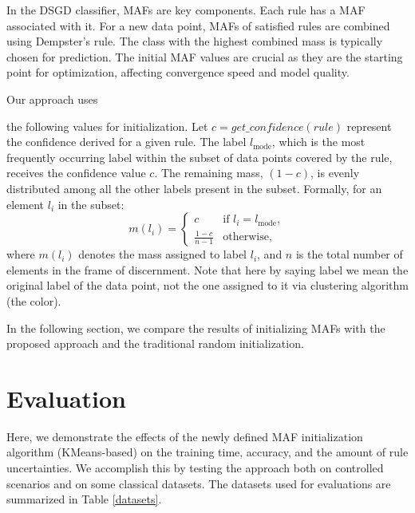 \documentclass[10pt,a4paper,oneside]{article}
\begin{document}
{\color{red}In the DSGD classifier, MAFs are key components. Each rule has a MAF associated with it. For a new data point, MAFs of satisfied rules are combined using Dempster's rule. The class with the highest combined mass is typically chosen for prediction. The initial MAF values are crucial as they are the starting point for optimization, affecting convergence speed and model quality.

Our approach uses} the following values for initialization. Let $c = get\_confidence(rule)$ represent the confidence derived for a given rule. The label $l_{\text{mode}}$, which is the most frequently occurring label within the subset of data points covered by the rule, receives the confidence value $c$. The remaining mass, $(1 - c)$, is evenly distributed among all the other labels present in the subset. Formally, for an element $l_i$ in the subset:
\[
m(l_i) = 
\begin{cases} 
c & \text{if } l_i = l_{\text{mode}}, \\
\frac{1-c}{n-1} & \text{otherwise},
\end{cases}
\]
where $m(l_i)$ denotes the mass assigned to label $l_i$, and $n$ is the total number of elements in the frame of discernment. Note that here by saying label we mean the original label of the data point, not the one assigned to it via clustering algorithm (the color). 

{\color{red}In the following section, we compare the results of initializing MAFs with the proposed approach and the traditional random initialization.}

\section{Evaluation}\label{3}
Here{\color{black},} we demonstrate the effects of the newly defined MAF initialization algorithm (KMeans-based) on the training time, accuracy, and the amount of rule uncertainties. We accomplish this by testing the approach both on controlled scenarios and on some classical datasets. The datasets used for evaluations are summarized in Table \ref{datasets}. 
\\
\renewcommand{\arraystretch}{1.15}   %
\end{document}
